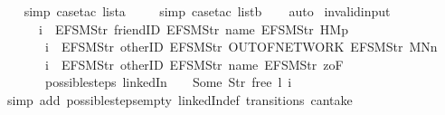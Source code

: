 \begin{isabellebody}
\ \ \isamarkupfalse%
\ {\isacharparenleft}simp{\isacharcomma}\ case{\isacharunderscore}tac\ lista{\isacharparenright}\isanewline
\ \ \ \isamarkupfalse%
\ {\isacharparenleft}simp{\isacharcomma}\ case{\isacharunderscore}tac\ listb{\isacharparenright}\isanewline
\ \ \isamarkupfalse%
\ auto%
\endisatagproof
{\isafoldproof}%
%
\isadelimproof
\isanewline
%
\endisadelimproof
\isanewline
{}\isamarkupfalse%
\ invalid{\isacharunderscore}input{\isacharunderscore}{}{\isacharcolon}\isanewline
\ \ \ \ \ \ {\isachardoublequoteopen}i\ {\isasymnoteq}\ {\isacharbrackleft}EFSM{\isachardot}Str\ {\isacharprime}{\isacharprime}friendID{\isacharprime}{\isacharprime}{\isacharcomma}\ EFSM{\isachardot}Str\ {\isacharprime}{\isacharprime}name{\isacharprime}{\isacharprime}{\isacharcomma}\ EFSM{\isachardot}Str\ {\isacharprime}{\isacharprime}HM{}p{\isacharprime}{\isacharprime}{\isacharbrackright}\ {\isasymLongrightarrow}\isanewline
\ \ \ \ \ \ \ i\ {\isasymnoteq}\ {\isacharbrackleft}EFSM{\isachardot}Str\ {\isacharprime}{\isacharprime}otherID{\isacharprime}{\isacharprime}{\isacharcomma}\ EFSM{\isachardot}Str\ {\isacharprime}{\isacharprime}OUT{\isacharunderscore}OF{\isacharunderscore}NETWORK{\isacharprime}{\isacharprime}{\isacharcomma}\ EFSM{\isachardot}Str\ {\isacharprime}{\isacharprime}MNn{}{\isacharprime}{\isacharprime}{\isacharbrackright}\ {\isasymLongrightarrow}\isanewline
\ \ \ \ \ \ \ i\ {\isasymnoteq}\ {\isacharbrackleft}EFSM{\isachardot}Str\ {\isacharprime}{\isacharprime}otherID{\isacharprime}{\isacharprime}{\isacharcomma}\ EFSM{\isachardot}Str\ {\isacharprime}{\isacharprime}name{\isacharprime}{\isacharprime}{\isacharcomma}\ EFSM{\isachardot}Str\ {\isacharprime}{\isacharprime}{}zoF{\isacharprime}{\isacharprime}{\isacharbrackright}\ {\isasymLongrightarrow}\isanewline
\ \ \ \ \ \ \ possible{\isacharunderscore}steps\ linkedIn\ {}\ {\isacharparenleft}{\isacharless}{\isachargreater}{\isacharparenleft}{}\ {\isachardollar}{\isacharcolon}{\isacharequal}\ Some\ {\isacharparenleft}Str\ {\isacharprime}{\isacharprime}free{\isacharprime}{\isacharprime}{\isacharparenright}{\isacharparenright}{\isacharparenright}\ l\ i\ {\isacharequal}\ {\isacharbraceleft}{\isacharbar}{\isacharbar}{\isacharbraceright}{\isachardoublequoteclose}\isanewline
%
\isadelimproof
\ \ %
\endisadelimproof
%
\isatagproof
{}\isamarkupfalse%
\ {\isacharparenleft}simp\ add{\isacharcolon}\ possible{\isacharunderscore}steps{\isacharunderscore}empty\ linkedIn{\isacharunderscore}def\ transitions\ can{\isacharunderscore}take{\isacharparenright}\isanewline

\end{isabellebody}
